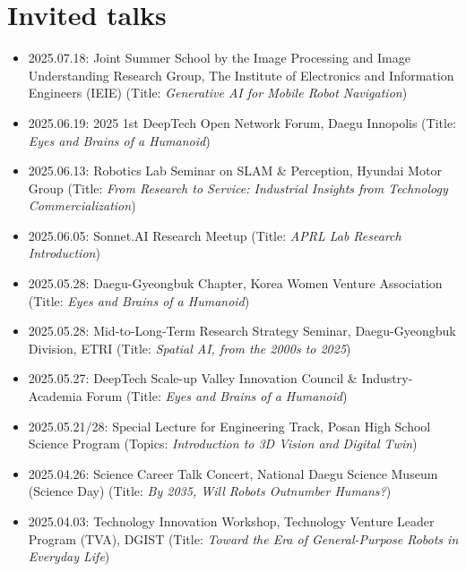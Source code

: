 \documentclass{cv} %
\begin{document}
\section{Invited talks}
\begin{itemize}[label=$\cdot$]
    \item 2025.07.18: Joint Summer School by the Image Processing and Image Understanding Research Group, The Institute of Electronics and Information Engineers (IEIE)  
    \hfill (Title: \textit{Generative AI for Mobile Robot Navigation})

    \item 2025.06.19: 2025 1st DeepTech Open Network Forum, Daegu Innopolis  
    \hfill (Title: \textit{Eyes and Brains of a Humanoid})
    
    \item 2025.06.13: Robotics Lab Seminar on SLAM \& Perception, Hyundai Motor Group  
    \hfill (Title: \textit{From Research to Service: Industrial Insights from Technology Commercialization})
    
    \item 2025.06.05: Sonnet.AI Research Meetup  
    \hfill (Title: \textit{APRL Lab Research Introduction})
    
    \item 2025.05.28: Daegu-Gyeongbuk Chapter, Korea Women Venture Association  
    \hfill (Title: \textit{Eyes and Brains of a Humanoid})
    
    \item 2025.05.28: Mid-to-Long-Term Research Strategy Seminar, Daegu-Gyeongbuk Division, ETRI  
    \hfill (Title: \textit{Spatial AI, from the 2000s to 2025})
    
    \item 2025.05.27: DeepTech Scale-up Valley Innovation Council \& Industry-Academia Forum  
    \hfill (Title: \textit{Eyes and Brains of a Humanoid})
    
    \item 2025.05.21/28: Special Lecture for Engineering Track, Posan High School Science Program  
    \hfill (Topics: \textit{Introduction to 3D Vision and Digital Twin})
    
    \item 2025.04.26: Science Career Talk Concert, National Daegu Science Museum (Science Day)  
    \hfill (Title: \textit{By 2035, Will Robots Outnumber Humans?})
    
    \item 2025.04.03: Technology Innovation Workshop, Technology Venture Leader Program (TVA), DGIST  
    \hfill (Title: \textit{Toward the Era of General-Purpose Robots in Everyday Life})


\end{itemize}
\end{document}

